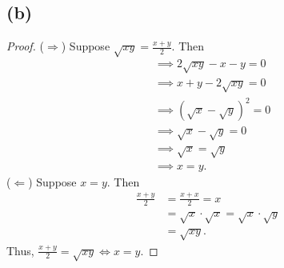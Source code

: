 \documentclass{article}
\begin{document}
\subsection*{(b)}
\begin{proof}
	($\Rightarrow$) Suppose $\sqrt{xy} = \frac{x+y}{2}$. Then
	\begin{align}
		&\implies 2\sqrt{xy} - x - y = 0 \\
		&\implies x + y - 2\sqrt{xy} = 0 \\
		&\implies \left(\sqrt{x} - \sqrt{y}\right)^2 = 0 \\
		&\implies \sqrt{x} - \sqrt{y} = 0 \\
		&\implies \sqrt{x} = \sqrt{y} \\
		&\implies x = y.
	\end{align}
	($\Leftarrow$) Suppose $x=y$. Then
	\begin{align}
		\frac{x+y}{2} &= \frac{x+x}{2} = x \\
		&= \sqrt{x}\cdot \sqrt{x} = \sqrt{x}\cdot \sqrt{y}\\
		&= \sqrt{xy}.
	\end{align}
	Thus, $\frac{x+y}{2}=\sqrt{xy} \iff x=y$.
\end{proof}
\end{document}
